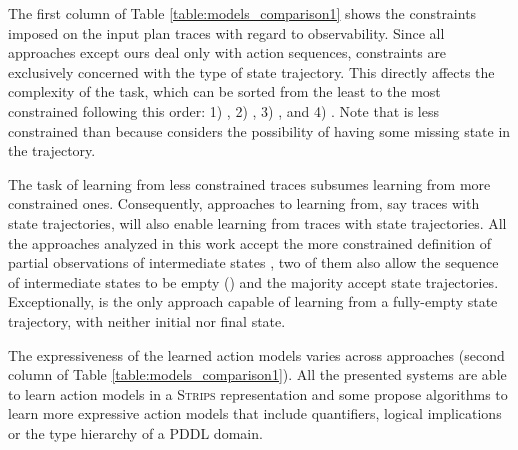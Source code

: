 The first column of Table \ref{table:models_comparison1} shows the constraints imposed on the input plan traces with regard to observability. Since all approaches except ours deal only with \FO action sequences, constraints are exclusively concerned with the type of state trajectory. This directly affects the complexity of the task, which can be sorted from the least to the most constrained following this order: 1) \NO, 2) \PO, 3) \POstar, and 4) \FO. Note that \PO is less constrained than \POstar because \PO considers the possibility of having some missing state in the trajectory.

The task of learning from less constrained traces subsumes learning from more constrained ones. Consequently, approaches to learning from, say traces with \PO state trajectories, will also enable learning from traces with \POstar state trajectories. All the approaches analyzed in this work accept the more constrained definition of partial observations of intermediate states \POstar, two of them also allow the sequence of intermediate states to be empty (\PO) and the majority accept \NO state trajectories. \textcolor[rgb]{1.00,0.00,0.00}{Exceptionally, \LOCM is the only approach capable of learning from a fully-empty state trajectory, with neither initial nor final state.}



The expressiveness of the learned action models varies across approaches (second column of Table \ref{table:models_comparison1}). All the presented systems are able to learn action models in a \textsc{Strips}  representation \cite{fikes1971strips} and some propose algorithms to learn more expressive action models that include quantifiers, logical implications or the type hierarchy of a PDDL domain.

